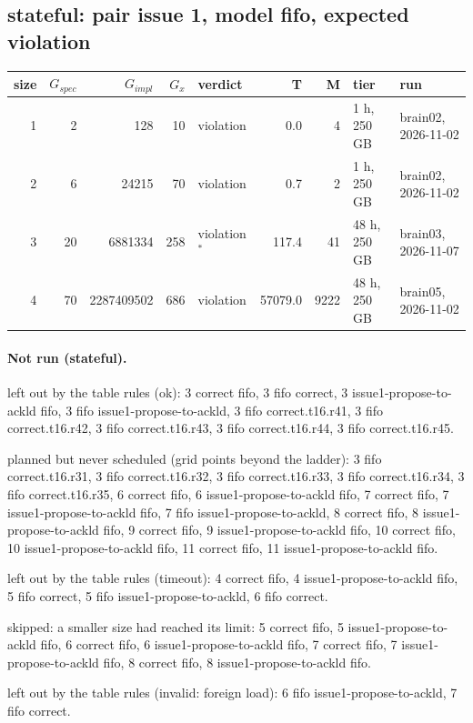 \documentclass[10pt]{article}
\begin{document}
\subsection*{stateful: pair \textsf{issue 1}, model fifo, expected violation}
\begin{longtable}{@{}rrrrlrrll@{}}
\toprule
size & $G_{\mathit{spec}}$ & $G_{\mathit{impl}}$ & $G_x$ & verdict & T & M & tier & run \\
\midrule
\endhead
\color{blue} 1 & 2 & 128 & 10 & violation & 0.0 & 4 & 1 h, 250 GB & brain02, 2026-11-02 \\
\color{blue} 2 & 6 & 24215 & 70 & violation & 0.7 & 2 & 1 h, 250 GB & brain02, 2026-11-02 \\
\color{blue} 3 & 20 & 6881334 & 258 & violation$^{\ast}$ & 117.4 & 41 & 48 h, 250 GB & brain03, 2026-11-07 \\
\color{blue} 4 & 70 & 2287409502 & 686 & violation & 57079.0 & 9222 & 48 h, 250 GB & brain05, 2026-11-02 \\
\bottomrule
\end{longtable}
\paragraph{Not run (stateful).}
left out by the table rules (ok): 3 correct fifo, 3 fifo correct, 3 issue1-propose-to-ackld fifo, 3 fifo issue1-propose-to-ackld, 3 fifo correct.t16.r41, 3 fifo correct.t16.r42, 3 fifo correct.t16.r43, 3 fifo correct.t16.r44, 3 fifo correct.t16.r45.\par
planned but never scheduled (grid points beyond the ladder): 3 fifo correct.t16.r31, 3 fifo correct.t16.r32, 3 fifo correct.t16.r33, 3 fifo correct.t16.r34, 3 fifo correct.t16.r35, 6 correct fifo, 6 issue1-propose-to-ackld fifo, 7 correct fifo, 7 issue1-propose-to-ackld fifo, 7 fifo issue1-propose-to-ackld, 8 correct fifo, 8 issue1-propose-to-ackld fifo, 9 correct fifo, 9 issue1-propose-to-ackld fifo, 10 correct fifo, 10 issue1-propose-to-ackld fifo, 11 correct fifo, 11 issue1-propose-to-ackld fifo.\par
left out by the table rules (timeout): 4 correct fifo, 4 issue1-propose-to-ackld fifo, 5 fifo correct, 5 fifo issue1-propose-to-ackld, 6 fifo correct.\par
skipped: a smaller size had reached its limit: 5 correct fifo, 5 issue1-propose-to-ackld fifo, 6 correct fifo, 6 issue1-propose-to-ackld fifo, 7 correct fifo, 7 issue1-propose-to-ackld fifo, 8 correct fifo, 8 issue1-propose-to-ackld fifo.\par
left out by the table rules (invalid: foreign load): 6 fifo issue1-propose-to-ackld, 7 fifo correct.\par
\end{document}
